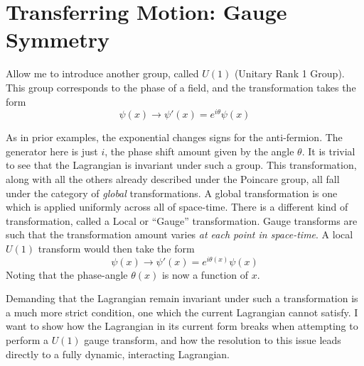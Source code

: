 

\section{Transferring Motion: Gauge Symmetry} \label{sec:gauge_symmetry}

    Allow me to introduce another group, called $U(1)$ (Unitary Rank 1 Group).
    This group corresponds to the phase of a field, and the transformation takes the form
    \begin{equation}
        \psi(x) \to \psi'(x) = e^{i\theta} \psi(x)
    \end{equation}

    As in prior examples, the exponential changes signs for the anti-fermion.
    The generator here is just $i$, the phase shift amount given by the angle $\theta$.
    It is trivial to see that the Lagrangian is invariant under such a group.
    This transformation, along with all the others already described under the Poincare group,
        all fall under the category of \textit{global} transformations.
    A global transformation is one which is applied uniformly across all of space-time.
    There is a different kind of transformation, called a Local or ``Gauge'' transformation.
    Gauge transforms are such that the transformation amount varies \textit{at each point in space-time}.
    A local $U(1)$ transform would then take the form 
    \begin{equation}
        \psi(x) \to \psi'(x) = e^{i\theta(x)} \psi(x)
    \end{equation}
    Noting that the phase-angle $\theta(x)$ is now a function of $x$.

    Demanding that the Lagrangian remain invariant under such a transformation is a much more strict condition,
        one which the current Lagrangian cannot satisfy.
    I want to show how the Lagrangian in its current form breaks when attempting to perform a $U(1)$ gauge transform,
        and how the resolution to this issue leads directly to a fully dynamic, interacting Lagrangian.

